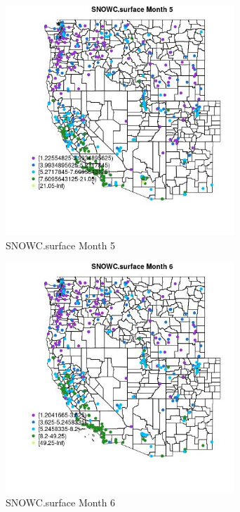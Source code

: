 \begin{figure} 
\centering  
\includegraphics[width=0.77\textwidth]{Code_Outputs/ML_input_report_ML_input_PM25_Step5_part_d_de_duplicated_aves_ML_input_MapObsMo5SNOWCsurface.jpg} 
\caption{\label{fig:ML_input_report_ML_input_PM25_Step5_part_d_de_duplicated_aves_ML_inputMapObsMo5SNOWCsurface}SNOWC.surface Month 5} 
\end{figure} 
 

\begin{figure} 
\centering  
\includegraphics[width=0.77\textwidth]{Code_Outputs/ML_input_report_ML_input_PM25_Step5_part_d_de_duplicated_aves_ML_input_MapObsMo6SNOWCsurface.jpg} 
\caption{\label{fig:ML_input_report_ML_input_PM25_Step5_part_d_de_duplicated_aves_ML_inputMapObsMo6SNOWCsurface}SNOWC.surface Month 6} 
\end{figure} 
 

